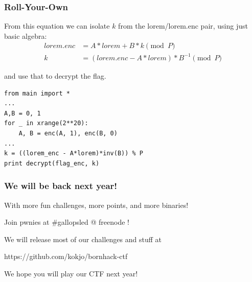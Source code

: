 \documentclass{beamer}
\begin{document}
\begin{frame}[fragile]
    \frametitle{Roll-Your-Own}
    From this equation we can isolate $k$ from the lorem/lorem.enc pair, using just basic algebra:
    \begin{align*}
         lorem.enc &= A * lorem + B * k \pmod{P} \\
         k &= (lorem.enc - A *lorem) * B^{-1} \pmod{P}
    \end{align*}

    \pause

    and use that to decrypt the flag.
    \begin{lstlisting}[style=custompy]
from main import *
...
A,B = 0, 1
for _ in xrange(2**20):
    A, B = enc(A, 1), enc(B, 0)
...
k = ((lorem_enc - A*lorem)*inv(B)) % P
print decrypt(flag_enc, k)
    \end{lstlisting}
\end{frame}

\begin{frame}
    \frametitle{We will be back next year!}
    
    With more fun challenges, more points, and more binaries!

    Join pwnies at \#gallopsled @ freenode !

    \pause
    
    We will release most of our challenges and stuff at

    https://github.com/kokjo/bornhack-ctf

    \pause

    We hope you will play our CTF next year!
\end{frame}
\end{document}
